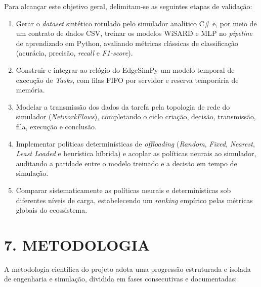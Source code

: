 \documentclass[12pt,a4paper]{article}
\begin{document}
Para alcançar este objetivo geral, delimitam-se as seguintes etapas de validação:
\begin{enumerate}
    \item Gerar o \textit{dataset} sintético rotulado pelo simulador analítico C\# e, por meio de um
    contrato de dados CSV, treinar os modelos WiSARD e MLP no \textit{pipeline} de aprendizado em
    Python, avaliando métricas clássicas de classificação (acurácia, precisão, \textit{recall} e
    \textit{F1-score}).
    \item Construir e integrar ao relógio do EdgeSimPy um modelo temporal de execução de
    \textit{Tasks}, com filas FIFO por servidor e reserva temporária de memória.
    \item Modelar a transmissão dos dados da tarefa pela topologia de rede do simulador
    (\textit{NetworkFlows}), completando o ciclo criação, decisão, transmissão, fila, execução e
    conclusão.
    \item Implementar políticas determinísticas de \textit{offloading} (\textit{Random},
    \textit{Fixed}, \textit{Nearest}, \textit{Least Loaded} e heurística híbrida) e acoplar as
    políticas neurais ao simulador, auditando a paridade entre o modelo treinado e a decisão em
    tempo de simulação.
    \item Comparar sistematicamente as políticas neurais e determinísticas sob diferentes níveis
    de carga, estabelecendo um \textit{ranking} empírico pelas métricas globais do ecossistema.
\end{enumerate}

\section*{\bfseries 7. METODOLOGIA}

A metodologia científica do projeto adota uma progressão estruturada e isolada de engenharia
e simulação, dividida em fases consecutivas e documentadas:\\
\end{document}

